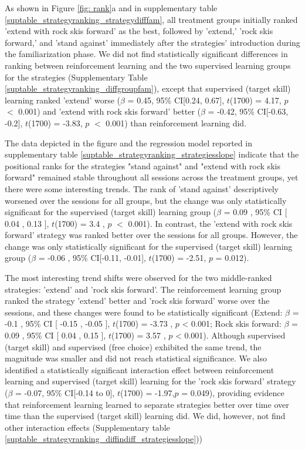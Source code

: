\documentclass[pdflatex,sn-mathphys-num]{sn-jnl}%
\theoremstyle{thmstyleone}%
\theoremstyle{thmstyletwo}%
\theoremstyle{thmstylethree}%
\begin{document}
As shown in Figure \ref{fig: rank}a and in supplementary table \ref{suptable_strategyranking_strategydifffam}, all treatment groups initially ranked 'extend with rock skis forward' as the best, followed by 'extend,' 'rock skis forward,' and 'stand against' immediately after the strategies' introduction during the familiarization phase. We did not find statistically significant differences in ranking between reinforcement learning and the two supervised learning groups for the strategies (Supplementary Table \ref{suptable_strategyranking_diffgroupfam}), except that supervised (target skill) learning ranked 'extend' worse ($\beta$ = 0.45, 95\% CI[0.24,  0.67], $t$(1700) = 4.17, $p$ $<$ 0.001) and 'extend with rock skis forward' better  ($\beta$ = -0.42, 95\% CI[-0.63, -0.2], $t$(1700) = -3.83, $p$ $<$ 0.001) than reinforcement learning did.

The data depicted in the figure and the regression model reported in supplementary table \ref{suptable_strategyranking_strategiesslope} indicate that the positional ranks for the strategies "stand against" and "extend with rock skis forward" remained stable throughout all sessions across the treatment groups, yet there were some interesting trends. The rank of 'stand against' descriptively worsened over the sessions for all groups, but the change was only statistically significant for the supervised (target skill) learning group  ($\beta$ = 0.09 , 95\% CI [ 0.04 ,  0.13 ], $t$(1700) = 3.4 , $p$  $<$  0.001). In contrast, the 'extend with rock skis forward' strategy was ranked better over the sessions for all groups. However, the change was only statistically significant for the supervised (target skill) learning group ($\beta$ = -0.06 , 95\% CI[-0.11, -0.01], $t$(1700) = -2.51, $p$ = 0.012). 

The most interesting trend shifts were observed for the two middle-ranked strategies: 'extend' and 'rock skis forward'. The reinforcement learning group ranked the strategy 'extend' better and 'rock skis forward' worse over the sessions, and these changes were found to be statistically significant (Extend: $\beta$ = -0.1 , 95\% CI [ -0.15 ,  -0.05 ], $t$(1700) = -3.73 , $p$  <  0.001; Rock skis forward:  $\beta$ = 0.09 , 95\% CI [ 0.04 ,  0.15 ], $t$(1700) = 3.57 , $p$  <  0.001). Although supervised (target skill) and supervised (free choice) exhibited the same trend, the magnitude was smaller and did not reach statistical significance. We also identified a statistically significant interaction effect between reinforcement learning and supervised (target skill) learning for the 'rock skis forward' strategy ($\beta$ = -0.07, 95\% CI[-0.14 to 0], $t$(1700) = -1.97,$p$ = 0.049), providing evidence that reinforcement learning learned to separate strategies better over time over time than the supervised (target skill) learning did. We did, however, not find other interaction effects (Supplementary table \ref{suptable_strategyranking_diffindiff_strategiesslope})) 
\end{document}
